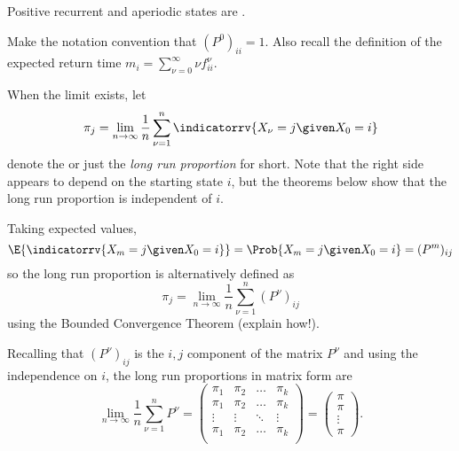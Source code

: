\documentclass[12pt]{article}
\begin{document}
\begin{enumerate}
\begin{definition}
    Positive recurrent and aperiodic states are .
\end{definition}

\begin{remark}
    Make the notation convention that \( (P^{0})_{ii} = 1 \).  Also
    recall the definition of the expected return time \( m_i = \sum_ {\nu=0}^
    {\infty} \nu f^\nu_{ii} \).
\end{remark}

\begin{definition}
    When the limit exists, let
    \[
        \pi_j = \lim_{n \to \infty} \frac{1}{n} \sum\limits_{\nu=1}^n
        \indicatorrv{X_{\nu}= j \given X_0 = i}
    \] denote the  or just the \emph{long run proportion} for short.
    Note that the right side appears to depend on the starting state \(
    i \), but the theorems below show that the long run proportion is
    independent of \( i \).
\end{definition}

\begin{remark}
    Taking expected values,
    \[
        \E{\indicatorrv{X_m = j \given X_0 = i}} = \Prob{X_m = j \given
        X_0 = i} = (P^m)_{ij}
    \] so the long run proportion is alternatively defined as
    \[
        \pi_j = \lim_{n \to \infty} \frac{1}{n} \sum\limits_{\nu=1}^n (P^
        {\nu})_ {ij}
    \] using the Bounded Convergence Theorem (explain how!).
\end{remark}

\begin{remark}
    Recalling that \( (P^{\nu})_{ij} \) is the \( i,j \) component of
    the matrix \( P^{\nu} \) and using the independence on \( i \), the
    long run proportions in matrix form are
    \[
        \lim_{n \to \infty} \frac{1}{n} \sum\limits_{\nu=1}^n P^{\nu} =
        \begin{pmatrix}
            \pi_1 & \pi_2 & \ldots & \pi_k \\
            \pi_1 & \pi_2 & \ldots & \pi_k \\
            \vdots & \vdots & \ddots & \vdots \\
            \pi_1 & \pi_2 & \ldots & \pi_k \\
        \end{pmatrix}
        =
        \begin{pmatrix}
            \pi \\
            \pi \\
            \vdots \\
            \pi
        \end{pmatrix}
        .
    \]
\end{remark}


\end{enumerate}
\end{document}
